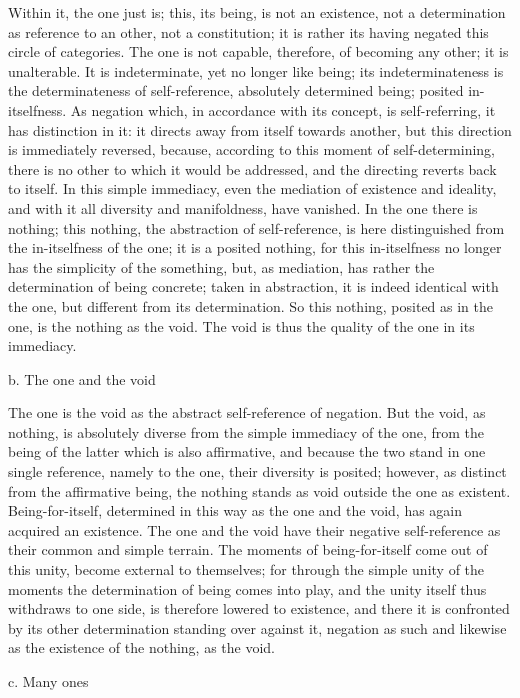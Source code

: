 Within it, the one just is;
this, its being, is not an existence,
not a determination as reference to an other,
not a constitution;
it is rather its having
negated this circle of categories.
The one is not capable, therefore,
of becoming any other;
it is unalterable.
It is indeterminate,
yet no longer like being;
its indeterminateness is
the determinateness of self-reference,
absolutely determined being;
posited in-itselfness.
As negation which, in accordance with its concept,
is self-referring, it has distinction in it:
it directs away from itself towards another,
but this direction is immediately reversed,
because, according to this moment of self-determining,
there is no other to which it would be addressed,
and the directing reverts back to itself.
In this simple immediacy,
even the mediation of existence and ideality,
and with it all diversity and manifoldness,
have vanished.
In the one there is nothing;
this nothing, the abstraction of self-reference,
is here distinguished from the in-itselfness of the one;
it is a posited nothing, for this in-itselfness
no longer has the simplicity of the something,
but, as mediation, has rather the determination of being concrete;
taken in abstraction, it is indeed identical with the one,
but different from its determination.
So this nothing, posited as in the one,
is the nothing as the void.
The void is thus the quality of
the one in its immediacy.

b. The one and the void

The one is the void as the abstract self-reference of negation.
But the void, as nothing, is absolutely diverse
from the simple immediacy of the one,
from the being of the latter which is also affirmative,
and because the two stand in one single reference,
namely to the one, their diversity is posited;
however, as distinct from the affirmative being,
the nothing stands as void outside the one as existent.
Being-for-itself, determined in this way
as the one and the void,
has again acquired an existence.
The one and the void have their negative self-reference
as their common and simple terrain.
The moments of being-for-itself
come out of this unity,
become external to themselves;
for through the simple unity of the moments
the determination of being comes into play,
and the unity itself thus withdraws to one side,
is therefore lowered to existence,
and there it is confronted by its other determination
standing over against it, negation as such
and likewise as the existence of the nothing,
as the void.

c. Many ones

